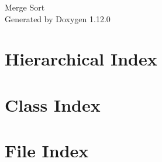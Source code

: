 \documentclass[twoside]{book}
\newcommand{\+}{\discretionary{\mbox{\scriptsize$\hookleftarrow$}}{}{}}
\newcommand{\clearemptydoublepage}{%
    \newpage{\pagestyle{empty}\cleardoublepage}%
  }
\begin{document}
  \raggedbottom
    \hypersetup{pageanchor=false,
                bookmarksnumbered=true,
                pdfencoding=unicode
               }
  \begin{titlepage}
  \vspace*{7cm}
  \begin{center}%
  {\Large Merge Sort}\\
  \vspace*{1cm}
  {\large Generated by Doxygen 1.12.0}\\
  \end{center}
  \end{titlepage}
  \clearemptydoublepage
  \tableofcontents
  \clearemptydoublepage
  \hypersetup{pageanchor=true}



\chapter{Hierarchical Index}

\chapter{Class Index}

\chapter{File Index}

\end{document}
